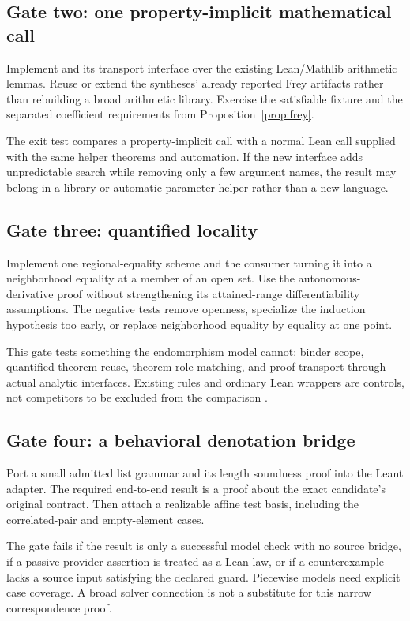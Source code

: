 \documentclass[11pt,a4paper]{article}
\newcommand{\code}[1]{\texttt{\detokenize{#1}}}
\theoremstyle{definition}
\theoremstyle{remark}
\begin{document}
\subsection{Gate two: one property-implicit mathematical call}

Implement \code{exact_quotient} and its transport interface over the existing
Lean/Mathlib arithmetic lemmas. Reuse or extend the syntheses' already reported
Frey artifacts rather than rebuilding a broad arithmetic library. Exercise the
satisfiable fixture and the separated coefficient requirements from
Proposition~\ref{prop:frey}.

The exit test compares a property-implicit call with a normal Lean call supplied
with the same helper theorems and automation. If the new interface adds
unpredictable search while removing only a few argument names, the result may
belong in a library or automatic-parameter helper rather than a new language.

\subsection{Gate three: quantified locality}

Implement one regional-equality scheme and the consumer turning it into a
neighborhood equality at a member of an open set. Use the autonomous-derivative
proof without strengthening its attained-range differentiability assumptions.
The negative tests remove openness, specialize the induction hypothesis too
early, or replace neighborhood equality by equality at one point.

This gate tests something the endomorphism model cannot: binder scope,
quantified theorem reuse, theorem-role matching, and proof transport through
actual analytic interfaces. Existing \code{fun_prop} rules and ordinary Lean
wrappers are controls, not competitors to be excluded from the comparison
\cite{fun-prop}.

\subsection{Gate four: a behavioral denotation bridge}

Port a small admitted list grammar and its length soundness proof into the
Leant adapter. The required end-to-end result is a proof about the exact
candidate's original contract. Then attach a realizable affine test basis,
including the correlated-pair and empty-element cases.

The gate fails if the result is only a successful model check with no source
bridge, if a passive provider assertion is treated as a Lean law, or if a
counterexample lacks a source input satisfying the declared guard. Piecewise
models need explicit case coverage. A broad solver connection is not a
substitute for this narrow correspondence proof.
\end{document}

